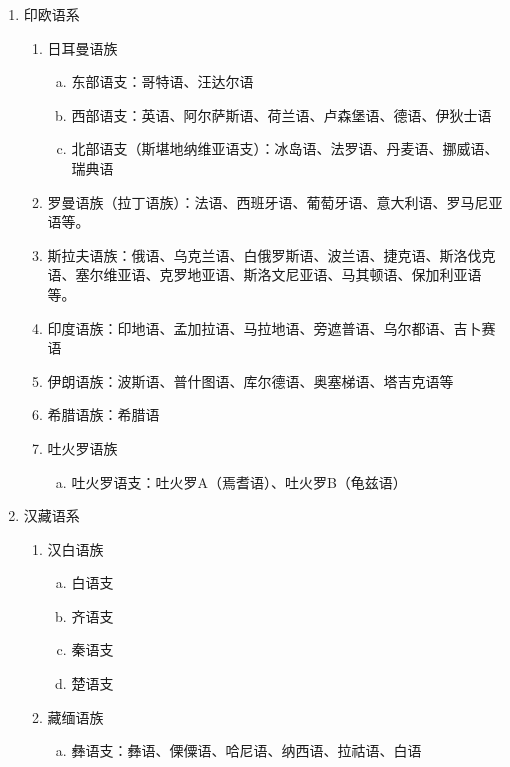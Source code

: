\documentclass[12pt]{book}
\begin{document}
\begin{enumerate}[1.]
    \item 印欧语系
          \begin{enumerate}[(1)]
              \item 日耳曼语族
              \begin{enumerate}[a.]
                  \item 东部语支：哥特语、汪达尔语
                  \item 西部语支：英语、阿尔萨斯语、荷兰语、卢森堡语、德语、伊狄士语
                  \item 北部语支（斯堪地纳维亚语支）：冰岛语、法罗语、丹麦语、挪威语、瑞典语
              \end{enumerate}
              \item 罗曼语族（拉丁语族）：法语、西班牙语、葡萄牙语、意大利语、罗马尼亚语等。
              \item 斯拉夫语族：俄语、乌克兰语、白俄罗斯语、波兰语、捷克语、斯洛伐克语、塞尔维亚语、克罗地亚语、斯洛文尼亚语、马其顿语、保加利亚语等。
              \item 印度语族：印地语、孟加拉语、马拉地语、旁遮普语、乌尔都语、吉卜赛语
              \item 伊朗语族：波斯语、普什图语、库尔德语、奥塞梯语、塔吉克语等
              \item 希腊语族：希腊语
              \item 吐火罗语族
              \begin{enumerate}[a.]
                  \item 吐火罗语支：吐火罗A（焉耆语）、吐火罗B（龟兹语）
              \end{enumerate}
          \end{enumerate}
    \item 汉藏语系
          \begin{enumerate}[(1)]
              \item 汉白语族
              \begin{enumerate}[a.]
                  \item 白语支
                  \item 齐语支
                  \item 秦语支
                  \item 楚语支
              \end{enumerate}
              \item 藏缅语族
                    \begin{enumerate}[a.]
                        \item 彝语支：彝语、傈僳语、哈尼语、纳西语、拉祜语、白语

\end{enumerate}
\end{enumerate}
\end{enumerate}
\end{document}

